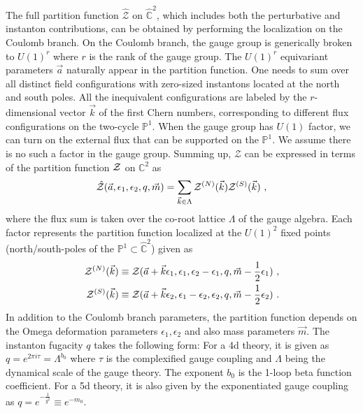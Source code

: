 \documentclass[letterpaper, 11pt]{article}
\def\IC{\mathbb{C}}
\def\IP{\mathbb{P}}
\def\CZ{{\cal Z}}
\def\e{\epsilon}
\def\half{\frac{1}{2}}
\begin{document}
The full partition function $\hat{\mathcal Z}$ on $\hat{\IC}^2$, which includes both the perturbative and instanton contributions, can be obtained by performing the localization on the Coulomb branch. On the Coulomb branch, the gauge group is generically broken to $U(1)^r$ where $r$ is the rank of the gauge group. The $U(1)^r$ equivariant parameters $\vec{a}$ naturally appear in the partition function. One needs to sum over all distinct field configurations with zero-sized instantons located at the north and south poles. All the inequivalent configurations are labeled by the $r$-dimensional vector $\vec{k}$ of the first Chern numbers, corresponding to different flux configurations on the two-cycle $\mathbb{P}^1$. When the gauge group has $U(1)$ factor, we can turn on the external flux that can be supported on the $\IP^1$. We assume there is no such a factor in the gauge group. 
Summing up, $\hat{\mathcal Z}$ can be expressed in terms of the partition function $\CZ$ on $\IC^2$ as \cite{Nekrasov:2003vi, Gottsche:2006bm, Gottsche:2006tn, Gasparim:2008ri, Bonelli:2012ny}
\begin{align} \label{eq:blowup}
  \hat{\mathcal Z}(\vec{a}, \e_1, \e_2, q, \vec{m}) = \sum_{\vec{k} \in \Lambda} \CZ^{(N)}(\vec{k}) \CZ^{(S)}(\vec{k}) \ , 
\end{align}
where the flux sum is taken over the co-root lattice $\Lambda$ of the gauge algebra. Each factor represents the partition function localized at the $U(1)^2$ fixed points (north/south-poles of the $\IP^1 \subset \hat{\IC}^2$) given as 
\begin{align}
\begin{split}
 \CZ^{(N)}(\vec{k}) &\equiv \CZ (\vec{a}+ \vec{k} \e_1, \e_1, \e_2 - \e_1, q, \vec{m}-\half{\e_1}) \ , \\
 \CZ^{(S)}(\vec{k}) & \equiv  \CZ (\vec{a}+\vec{k} \e_2, \e_1 - \e_2, \e_2, q, \vec{m}-\half{\e_2})  \ . 
\end{split}
\end{align}
 In addition to the Coulomb branch parameters, the partition function depends on the Omega deformation parameters $\e_1, \e_2$ and also mass parameters $\vec{m}$. The instanton fugacity $q$ takes the following form: For a 4d theory, it is given as $q = e^{2\pi i \tau} = \Lambda^{b_0} $ where $\tau$ is the complexified gauge coupling and $\Lambda$ being the dynamical scale of the gauge theory. The exponent $b_0$ is the 1-loop beta function coefficient. For a 5d theory, it is also given by the exponentiated gauge coupling as $q=e^{-\frac{1}{g^2}} \equiv e^{-m_0}$. 
\end{document}
